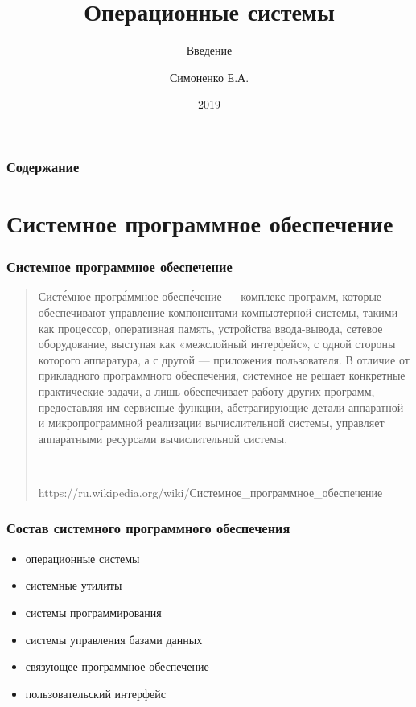 \documentclass[9pt,pdf]{beamer}
\begin{document}
	
\author{Симоненко Е.А.}
\title{Операционные системы}
\subtitle{Введение}
\date{2019}

\nocite{*}
	
\begin{frame}
	\titlepage
\end{frame}
	
\begin{frame}
	\frametitle{Содержание}
	\tableofcontents
\end{frame}

\section{Системное программное обеспечение}

\begin{frame}
	\frametitle{Системное программное обеспечение}
	\begin{quotation}
		Систе́мное програ́ммное обеспе́чение — комплекс программ, которые обеспечивают управление компонентами компьютерной системы, такими как процессор, оперативная память, устройства ввода-вывода, сетевое оборудование, выступая как «межслойный интерфейс», с одной стороны которого аппаратура, а с другой — приложения пользователя. В отличие от прикладного программного обеспечения, системное не решает конкретные практические задачи, а лишь обеспечивает работу других программ, предоставляя им сервисные функции, абстрагирующие детали аппаратной и микропрограммной реализации вычислительной системы, управляет аппаратными ресурсами вычислительной системы.
		
		---
		
		https://ru.wikipedia.org/wiki/Системное\_программное\_обеспечение
	\end{quotation}
\end{frame}

\begin{frame}
	\frametitle{Состав системного программного обеспечения}
	\begin{itemize}
		\item операционные системы
		\item системные утилиты
		\item системы программирования
		\item системы управления базами данных
		\item связующее программное обеспечение
		\item пользовательский интерфейс
	\end{itemize}
\end{frame}
\end{document}
